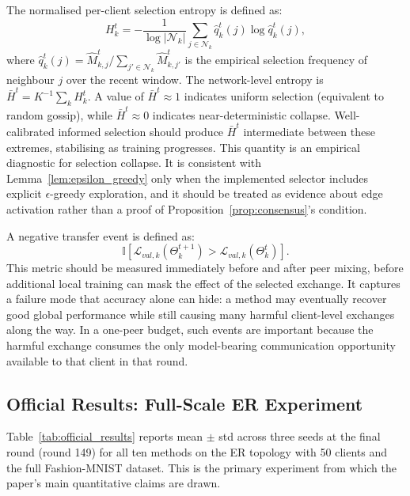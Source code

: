 \documentclass[conference]{IEEEtran}
\newcommand{\rev}[1]{{\color{red}#1}}
\begin{document}
The normalised per-client selection entropy is defined as:
\begin{equation}
    H_k^t
    =
    -\frac{1}{\log|\mathcal{N}_k|}
    \sum_{j\in\mathcal{N}_k}
    \hat{q}_k^t(j)\log\hat{q}_k^t(j),
    \label{eq:per_client_entropy}
\end{equation}
where $\hat{q}_k^t(j) = \hat{M}_{k,j}^t / \sum_{j'\in\mathcal{N}_k}\hat{M}_{k,j'}^t$ is the empirical selection frequency of neighbour $j$ over the recent window. The network-level entropy is $\bar{H}^t = K^{-1}\sum_k H_k^t$. A value of $\bar{H}^t \approx 1$ indicates uniform selection (equivalent to random gossip), while $\bar{H}^t \approx 0$ indicates near-deterministic collapse. Well-calibrated informed selection should produce $\bar{H}^t$ intermediate between these extremes, stabilising as training progresses. \rev{This quantity is an empirical diagnostic for selection collapse. It is consistent with Lemma~\ref{lem:epsilon_greedy} only when the implemented selector includes explicit \(\epsilon\)-greedy exploration, and it should be treated as evidence about edge activation rather than a proof of Proposition~\ref{prop:consensus}'s condition.}

A negative transfer event is defined as:
\begin{equation}
    \mathbb{I}\left[
    \mathcal{L}_{val,k}(\Theta_k^{t+1})
    >
    \mathcal{L}_{val,k}(\Theta_k^{t})
    \right].
    \label{eq:auto-102}
\end{equation}
This metric should be measured immediately before and after peer mixing, before additional local training can mask the effect of the selected exchange. It captures a failure mode that accuracy alone can hide: a method may eventually recover good global performance while still causing many harmful client-level exchanges along the way. In a one-peer budget, such events are important because the harmful exchange consumes the only model-bearing communication opportunity available to that client in that round.

\subsection{Official Results: Full-Scale ER Experiment}
\label{subsec:results-official}

Table~\ref{tab:official_results} reports mean $\pm$ std across three seeds at the final round (round 149) for all ten methods on the ER topology with 50 clients and the full Fashion-MNIST dataset. This is the primary experiment from which the paper's main quantitative claims are drawn.
\end{document}

